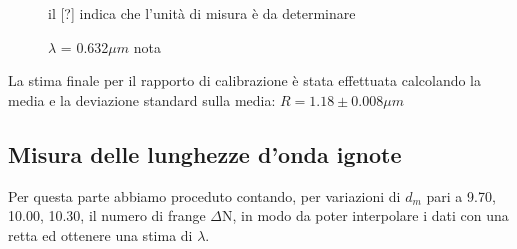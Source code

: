 \documentclass{article}
\theoremstyle{definition}
\begin{document}
\begin{figure}[!htbp]
    	\captionsetup{labelformat=empty}
    	\caption{il [?] indica che l'unità di misura è da determinare}
             \caption{$\lambda$ = 0.632$\mu m$ nota}
    \end{figure}
    
La stima finale per il rapporto di calibrazione è stata effettuata calcolando la media e la deviazione standard sulla media: \(R =  1.18 \pm 0.008 \mu m\)

\subsection{Misura delle lunghezze d'onda ignote}

Per questa parte abbiamo proceduto contando, per variazioni di $d_{m}$ pari a 9.70, 10.00, 10.30, il numero di frange $\Delta$N, in modo da poter interpolare i dati con una retta ed ottenere una stima di $\lambda$.
\end{document}
